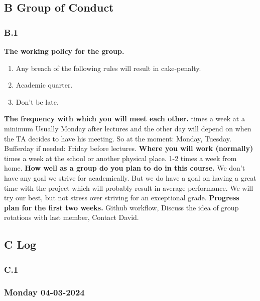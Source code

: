 \subsection*{B Group of Conduct}
\subsubsection*{B.1}
\textbf{The working policy for the group.}
\begin{enumerate}
\item Any breach of the following rules will result in cake-penalty.
\item Academic quarter.
\item Don’t be late.
\end{enumerate}
\textbf{The frequency with which you will meet each other.}
 times a week at a minimum
\newline
Usually Monday after lectures and the other day will depend on when the TA decides to have his meeting. So at the moment: Monday, Tuesday.
\newline
Bufferday if needed: Friday before lectures.
\newline
\textbf{Where you will work (normally)}
 times a week at the school or another physical place. 1-2 times a week from home.
\newline
\textbf{How well as a group do you plan to do in this course.}
\newline
We don’t have any goal we strive for academically. But we do have a goal on having a great time with the project which will probably result in average performance. We will try our best, but not stress over striving for an exceptional grade.
\newline
\textbf{Progress plan for the first two weeks.}
\newline
 Github workflow, Discuss the idea of group rotations with last member, Contact David.
\newpage
\subsection*{C Log}
\subsubsection*{C.1}
\hypertarget{monday-04-03-2024}{%
\subsubsection*{Monday 04-03-2024}\label{monday-04-03-2024}}


